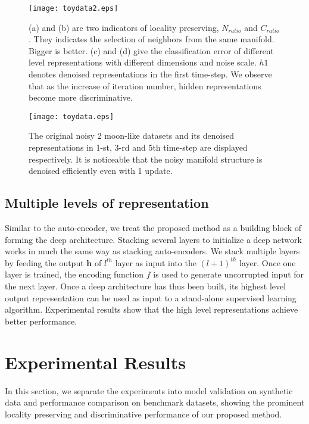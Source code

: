 \documentclass{article}
\def \h{\mathbf h}
\begin{document}
\begin{figure*}[t]
\begin{center}
   \texttt{[image: toydata2.eps]}
\end{center}
   \caption{(a) and (b) are two indicators of locality preserving, $N_{ratio}$ and $C_{ratio}$. They indicates the selection of neighbors from the same manifold. Bigger is better. (c) and (d) give the classification error of different level representations with different dimensions and noise scale. $h1$ denotes denoised representations in the first time-step. We observe that as the increase of iteration number, hidden representations become more discriminative.}
\label{fig:toydata2}
\end{figure*}
\begin{figure*}[t]
\begin{center}
   \texttt{[image: toydata.eps]}
\end{center}
   \caption{The original noisy 2 moon-like datasets and its denoised representations in 1-st, 3-rd and 5th time-step are displayed respectively. It is noticeable that the noisy manifold structure is denoised efficiently even with 1 update.}
\label{fig:toydata}
\end{figure*}
\subsection{Multiple levels of representation}
Similar to the auto-encoder, we treat the proposed method as a building block of forming the deep architecture.  Stacking several layers to initialize a deep network works in much the same way as stacking auto-encoders. We stack multiple layers by feeding the output $\h$ of $l^{th}$ layer as input into the $(l+1)^{th}$ layer. Once one layer is trained, the encoding function $f$ is used to generate uncorrupted input for the next layer.  Once a deep architecture has thus been built, its highest level output representation can be used as input to a stand-alone supervised learning algorithm. Experimental results show that the high level representations achieve better performance.

\section{Experimental Results}
In this section,
we separate the experiments into
model validation on synthetic data
and performance comparison on benchmark datasets,
showing the prominent locality preserving and discriminative performance
of our proposed method.
\end{document}
